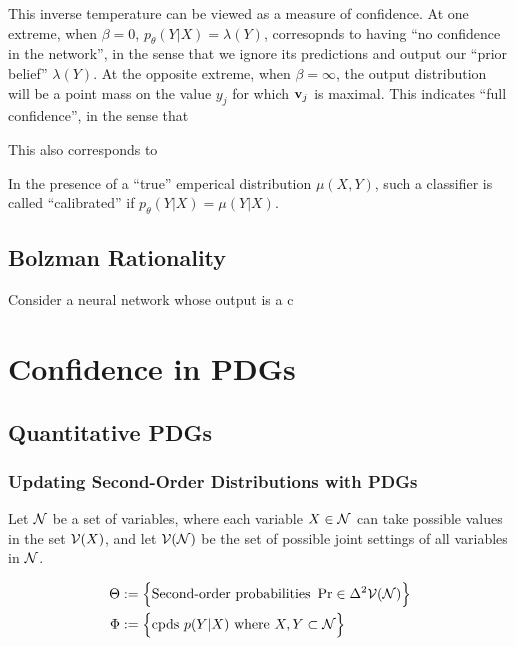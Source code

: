 \documentclass{article}
\begin{document}
This inverse temperature can be viewed as a measure of confidence. 
At one extreme, when $\beta = 0$, $p_\theta(Y|X) = \lambda(Y)$, corresopnds to having ``no confidence in the network'', in the sense that we ignore its predictions and output our ``prior belief'' $\lambda(Y)$. 
At the opposite extreme, when $\beta = \infty$, the output distribution will be a point mass on the value $y_j$ for which $\mathbf{v}_j$ is maximal.
This indicates ``full confidence'', in the sense that 

This also corresponds to 

In the presence of a ``true'' emperical distribution $\mu(X,Y)$, such a classifier is called ``calibrated'' if $p_\theta(Y|X) = \mu(Y|X)$. 

\subsection{Bolzman Rationality}

\begin{examplex}{}{}
	Consider a neural network whose output is a c
\end{examplex}

\section{Confidence in PDGs}
\subsection{Quantitative PDGs}

\subsubsection{Updating Second-Order Distributions with PDGs} 
	\label{sec:second-order-PDG}
\def\F{\mathtt{F1}}
Let $\mathcal N$ be a set of variables, where each variable $X \in \mathcal N$ can take possible values in the set $\mathcal V(X)$, and let $\mathcal V(\mathcal N)$ be the set of possible joint settings of all variables in $\mathcal N$.

\begin{align*}
	\Theta &:=
		\Big\{
		\text{Second-order probabilities}~ \Pr \in \Delta^2 \mathcal V(\mathcal N)
		\Big\} \\
	\Phi &:= \Big\{ \text{cpds}~ p(Y|X)
		\text{ where }  X, Y \subset \mathcal N \Big\}
\end{align*}
\end{document}
